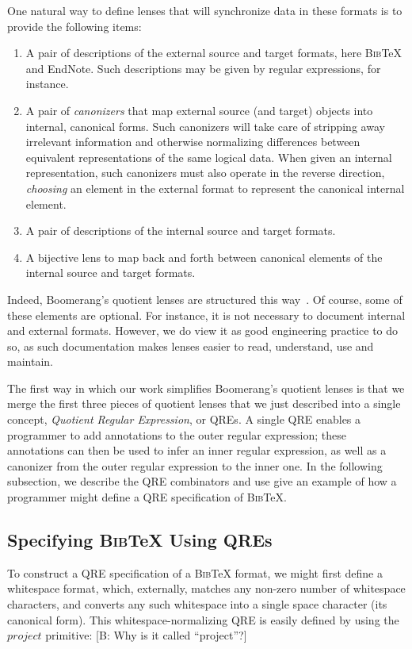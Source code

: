 \documentclass[acmsmall,review,anonymous]{acmart}
\newcommand{\FINISH}[3]{\ifdraft\textcolor{#1}{[#2: #3]}\fi}
\newcommand{\bcp}[1]{\FINISH{dkred}{B}{#1}}
\newcommand{\kw}[1]{\ensuremath{\mathit{#1}}}
\newcommand{\bibtex}{\textsc{Bib}\TeX{}}
\begin{document}
One natural way to define lenses that will synchronize data in these formats
is to provide the following items:
\begin{enumerate}
  \item A pair of descriptions of the external source and target formats, here
  \bibtex{} and EndNote. Such descriptions may be given by regular
  expressions, for instance.
  \item A pair of \emph{canonizers} that map external source (and target)
  objects into internal, canonical forms.  Such canonizers will take
  care of stripping away irrelevant information and otherwise normalizing
  differences between equivalent representations of the same logical data.
  When given an internal representation, such canonizers must also operate
  in the reverse direction, \emph{choosing} an element in the external format
  to represent the canonical internal element.
  \item A pair of descriptions of the internal source and
  target formats.
  \item A bijective lens to map back and forth between canonical elements
  of the internal source and target formats.
\end{enumerate}

\noindent
Indeed, Boomerang's quotient lenses are structured this
way~\cite{quotientlenses}. Of course, some of these elements are optional.  For
instance, it is not necessary to document internal and external formats.
However, we do view it as good engineering practice to do so, as such
documentation makes lenses easier to read, understand, use and maintain.

The first way in which our work simplifies Boomerang's quotient lenses is
that we merge the first three pieces of quotient lenses that we just described
into a single concept, {\em Quotient Regular Expression}, or QREs. A single QRE
enables a programmer to add annotations to the outer regular expression; these
annotations can then be used to infer an inner regular expression, as well as a
canonizer from the outer regular expression to the inner one. In the following
subsection, we describe the QRE combinators and use give an example of how a
programmer might define a QRE specification of \bibtex.

\subsection{Specifying \bibtex{} Using QREs}
\label{subsec:qre-expressions}
To construct a QRE specification of a \bibtex{} format, we might first define a
whitespace format, which, externally, matches any non-zero number of whitespace
characters, and converts any such whitespace into a single space character (its
canonical form). This whitespace-normalizing QRE is easily defined by using the
\kw{project} primitive: \bcp{Why is it called ``project''?}
\end{document}
